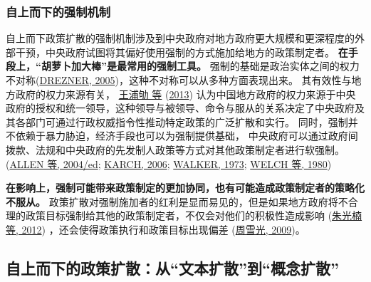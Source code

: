 \documentclass[
  12pt,
]{ctexart}
\begin{document}
\hypertarget{ux81eaux4e0aux800cux4e0bux7684ux5f3aux5236ux673aux5236}{%
\subsubsection{自上而下的强制机制}\label{ux81eaux4e0aux800cux4e0bux7684ux5f3aux5236ux673aux5236}}

自上而下政策扩散的强制机制涉及到中央政府对地方政府更大规模和更深程度的外部干预，中央政府试图将其偏好使用强制的方式施加给地方的政策制定者。
\textbf{在手段上，``胡萝卜加大棒''是最常用的强制工具。}
强制的基础是政治实体之间的权力不对称(\protect\hyperlink{ref-Drezner2005}{DREZNER, 2005})，这种不对称可以从多种方面表现出来。
其有效性与地方政府的权力来源有关， \protect\hyperlink{ref-WangPuQuLaiXianJin2013}{王浦劬 等} (\protect\hyperlink{ref-WangPuQuLaiXianJin2013}{2013}) 认为中国地方政府的权力来源于中央政府的授权和统一领导，这种领导与被领导、命令与服从的关系决定了中央政府及其各部门可通过行政权威指令性推动特定政策的广泛扩散和实行。
同时，强制并不依赖于暴力胁迫，经济手段也可以为强制提供基础，
中央政府可以通过政府间拨款、法规和中央政府的先发制人政策等方式对其他政策制定者进行软强制。(\protect\hyperlink{ref-AllenEtAl2004}{ALLEN 等, 2004/ed}; \protect\hyperlink{ref-Karch2006}{KARCH, 2006}; \protect\hyperlink{ref-Walker1973}{WALKER, 1973}; \protect\hyperlink{ref-WelchThompson1980}{WELCH 等, 1980})

\textbf{在影响上，强制可能带来政策制定的更加协同，也有可能造成政策制定者的策略化不服从。}
政策扩散对强制施加者的红利是显而易见的，但是如果地方政府将不合理的政策目标强制给其他的政策制定者，不仅会对他们的积极性造成影响 (\protect\hyperlink{ref-ZhuGuangNanEtAl2012a}{朱光楠 等, 2012}) ，还会使得政策执行和政策目标出现偏差 (\protect\hyperlink{ref-ZhouXueGuang2009a}{周雪光, 2009})。

\hypertarget{ux81eaux4e0aux800cux4e0bux7684ux653fux7b56ux6269ux6563ux4eceux6587ux672cux6269ux6563ux5230ux6982ux5ff5ux6269ux6563}{%
\subsection{自上而下的政策扩散：从``文本扩散''到``概念扩散''}\label{ux81eaux4e0aux800cux4e0bux7684ux653fux7b56ux6269ux6563ux4eceux6587ux672cux6269ux6563ux5230ux6982ux5ff5ux6269ux6563}}
\end{document}
